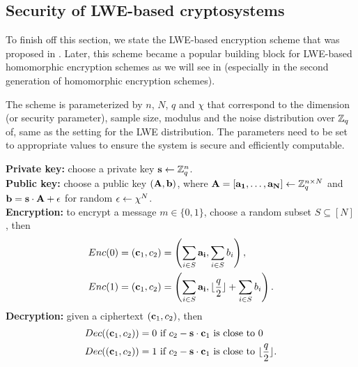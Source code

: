 \documentclass[../main.tex]{subfiles}
\begin{document}


\subsection{Security of LWE-based cryptosystems}
\label{subsec:lweSecurity}

To finish off this section, we state the LWE-based encryption scheme that was proposed in \cite{regev2009lattices}. Later, this scheme became a popular building block for LWE-based homomorphic encryption schemes as we will see in  (especially in the second generation of homomorphic encryption schemes). 

The scheme is parameterized by $n$, $N$, $q$ and $\chi$ that correspond to the dimension (or security parameter), sample size, modulus and the noise distribution over $\mathbb{Z}_q$ of, same as the setting for the LWE distribution. The parameters need to be set to appropriate values to ensure the system is secure and efficiently computable. 

\begin{tcolorbox}
\noindent
\textbf{Private key:} choose a private key $\mathbf{s} \leftarrow \mathbb{Z}_q^n$.\\
\textbf{Public key:} choose a public key $(\mathbf{A},\mathbf{b})$, where $\mathbf{A} = \left[\mathbf{a_1}, \dots, \mathbf{a_N}\right] \leftarrow \mathbb{Z}_q^{n \times N}$ and $\mathbf{b} = \mathbf{s} \cdot \mathbf{A} + \mathbf{\epsilon}$ for random $\mathbf{\epsilon} \leftarrow \chi^N$.\\
\textbf{Encryption:} to encrypt a message $m \in \{0, 1\}$, choose a random subset $S \subseteq [N]$, then
\begin{align*}
    Enc(0)&=(\mathbf{c}_1, c_2) = \left(\sum_{i \in S} \mathbf{a_i}, \sum_{i \in S} b_i\right), \\
    Enc(1) &= (\mathbf{c}_1, c_2) =\left(\sum_{i \in S} \mathbf{a_i}, \lfloor\frac{q}{2}\rfloor + \sum_{i \in S} b_i\right).
\end{align*}
\textbf{Decryption:} given a ciphertext $(\mathbf{c}_1, c_2)$, then
\begin{align*}
    Dec((\mathbf{c}_1, c_2)) &=0 \text{ if } c_2-\mathbf{s} \cdot \mathbf{c}_1 \text{ is close to 0}\\
    Dec((\mathbf{c}_1, c_2)) &=1 \text{ if } c_2-\mathbf{s} \cdot \mathbf{c}_1 \text{ is close to } \lfloor \frac{q}{2}\rfloor.
\end{align*}
\end{tcolorbox}
\end{document}
